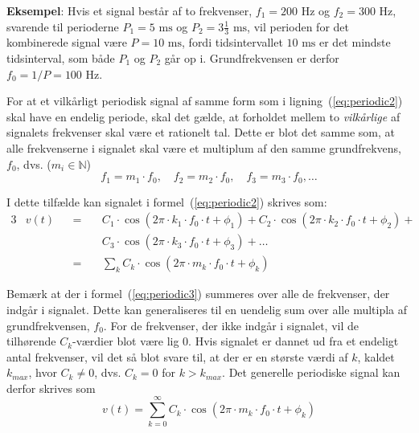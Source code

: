 \documentclass[11pt,a4paper]{article}
\begin{document}
\vspace{\baselineskip}\noindent{}\textbf{Eksempel}: Hvis et signal består af to frekvenser, $f_1=200\textrm{ Hz}$ og $f_2=300\textrm{ Hz}$, svarende til perioderne $P_1=5\textrm{ ms}$ og $P_2=3\frac{1}{3}\textrm{ ms}$, vil perioden for det kombinerede signal være $P=10\textrm{ ms}$, fordi tidsintervallet $10\textrm{ ms}$ er det mindste tidsinterval, som både $P_1$ og $P_2$ går op i. Grundfrekvensen er derfor $f_0=1/P=100\textrm{ Hz}$.\vspace{\baselineskip}

For at et vilkårligt periodisk signal af samme form som i ligning~(\ref{eq:periodic2}) skal have en endelig periode, skal det gælde, at forholdet mellem to \emph{vilkårlige} af signalets frekvenser skal være et rationelt tal. Dette er blot det samme som, at alle frekvenserne i signalet skal være et multiplum af den samme grundfrekvens, $f_0$, dvs. ($m_{i}\in\mathbb{N}$)
\begin{equation}
f_{1}=m_{1}\cdot{}f_{0},\quad{}f_{2}=m_{2}\cdot{}f_{0},\quad{}f_{3}=m_{3}\cdot{}f_{0},\ldots{}
\end{equation}

\noindent{}I dette tilfælde kan signalet i formel~(\ref{eq:periodic2}) skrives som:
\begin{alignat}{3}
& v(t) && =\  && C_{1}\cdot{}\cos(2\pi\cdot{}k_{1}\cdot{}f_{0}\cdot{}t+\phi_{1}) + C_{2}\cdot{}\cos(2\pi\cdot{}k_{2}\cdot{}f_{0}\cdot{}t+\phi_{2}) + \nonumber\\
& && \;  && C_{3}\cdot{}\cos(2\pi\cdot{}k_{3}\cdot{}f_{0}\cdot{}t+\phi_{3}) + \ldots \nonumber\\
& && =\  && \sum_{k} C_{k}\cdot{}\cos(2\pi\cdot{}m_{k}\cdot{}f_{0}\cdot{}t+\phi_{k})\label{eq:periodic3}
\end{alignat}

\noindent{}Bemærk at der i formel~(\ref{eq:periodic3}) summeres over alle de frekvenser, der indgår i signalet. Dette kan generaliseres til en uendelig sum over alle multipla af grundfrekvensen, $f_0$. For de frekvenser, der ikke indgår i signalet, vil de tilhørende $C_k$-værdier blot være lig 0. Hvis signalet er dannet ud fra et endeligt antal frekvenser, vil det så blot svare til, at der er en største værdi af $k$, kaldet $k_{max}$, hvor $C_k\ne{}0$, dvs. $C_k = 0$ for $k > k_{max}$. Det generelle periodiske signal kan derfor skrives som
\begin{equation}\label{eq:periodic4}
v(t)=\sum_{k=0}^{\infty} C_{k}\cdot{}\cos(2\pi\cdot{}m_{k}\cdot{}f_{0}\cdot{}t+\phi_{k})
\end{equation}
\end{document}
